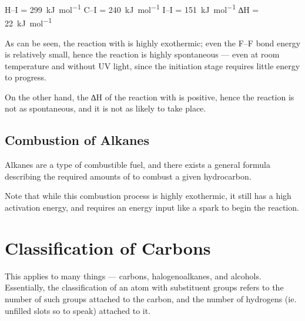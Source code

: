			\vspace{1.0em}
			\vbox{
						\tabto{25mm}	H–I			\tabto{50mm} = \SI{299}{\kilo\joule\per\mole}
							\tabto{25mm}	C–I			\tabto{50mm} = \SI{240}{\kilo\joule\per\mole}
							\tabto{25mm}	I–I			\tabto{50mm} = \SI{151}{\kilo\joule\per\mole}
							\tabto{25mm}	∆H	\tabto{50mm} = \SI[retain-explicit-plus]{+22}{\kilo\joule\per\mole}
			}

			As can be seen, the reaction with  is highly exothermic; even the F–F bond energy is relatively small, hence the
			reaction is highly spontaneous –– even at room temperature and without UV light, since the initiation stage requires
			little energy to progress.

			On the other hand, the ∆H of the reaction with  is positive, hence the reaction is not as spontaneous, and it is not
			as likely to take place.



	\pagebreak
	\subsection{Combustion of Alkanes}

		Alkanes are a type of combustible fuel, and there exists a general formula describing the required amounts of 
		to combust a given hydrocarbon.


		Note that while this combustion process is highly exothermic, it still has a high activation energy, and requires an energy
		input like a spark to begin the reaction.


	\section{Classification of Carbons}

		This applies to many things –– carbons, halogenoalkanes, and alcohols. Essentially, the classification of an atom with
		substituent groups refers to the number of such groups attached to the carbon, and the number of hydrogens (ie. unfilled
		slots so to speak) attached to it.

